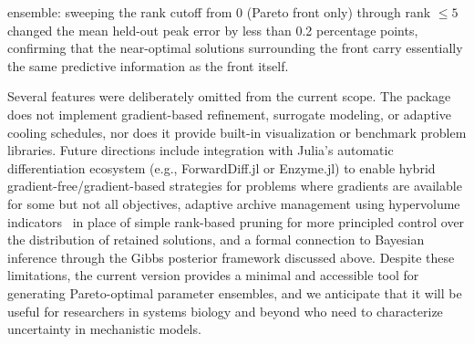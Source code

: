 \documentclass[preprint,review,12pt]{elsarticle}
\begin{document}
ensemble: sweeping the rank cutoff from 0 (Pareto front only) through rank $\leq 5$ changed the mean held-out peak error by less than 0.2 percentage points, confirming that the near-optimal solutions surrounding the front carry essentially the same predictive information as the front itself.

Several features were deliberately omitted from the current scope. The package does not implement gradient-based refinement, surrogate modeling, or adaptive cooling schedules, nor does it provide built-in visualization or benchmark problem libraries. Future directions include integration with Julia's automatic differentiation ecosystem (e.g., ForwardDiff.jl or Enzyme.jl) to enable hybrid gradient-free/gradient-based strategies for problems where gradients are available for some but not all objectives, adaptive archive management using hypervolume indicators~\cite{Zitzler2003} in place of simple rank-based pruning for more principled control over the distribution of retained solutions, and a formal connection to Bayesian inference through the Gibbs posterior framework discussed above. Despite these limitations, the current version provides a minimal and accessible tool for generating Pareto-optimal parameter ensembles, and we anticipate that it will be useful for researchers in systems biology and beyond who need to characterize uncertainty in mechanistic models.

\end{document}
